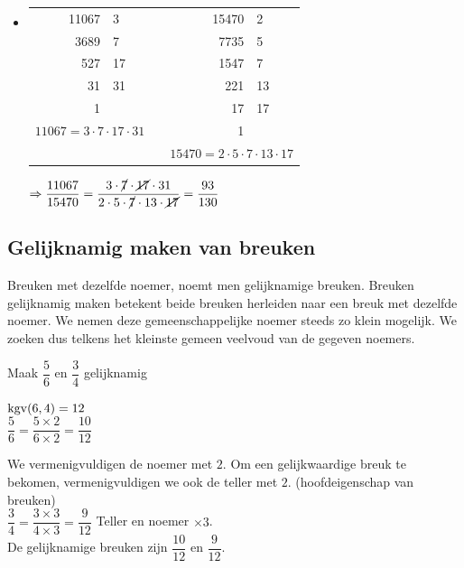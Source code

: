 \documentclass{bis}
\begin{document}
\begin{solution}
\begin{enumerate}
\begin{itemize}
    $\Rightarrow \dfrac{658}{1128}=\dfrac{\cancel{2}\cdot 7\cdot \cancel{47}}{2\cdot \cancel{2}\cdot 2\cdot 3\cdot \cancel{47}}=\dfrac{7}{12}$\\
    \item
    \begin{tabular}[t]{r|lp{2cm}r|l}
    11067 & 3  & & 15470 &  2\\
     3689 & 7  & &  7735 &  5\\
      527 & 17 & &  1547 &  7\\
       31 & 31 & &   221 & 13\\
        1 &    & &    17 & 17\\
    \multicolumn{2}{c}{$11067=3\cdot7\cdot17\cdot31$}& &   1 & \\
    \multicolumn{2}{c}{}
    &&\multicolumn{2}{c}{$15470=2\cdot5\cdot7\cdot13\cdot17$}
    \end{tabular}
    
    $\Rightarrow \dfrac{11067}{15470}=\dfrac{3\cdot\cancel{7}\cdot \cancel{17}\cdot 31}{2\cdot 5\cdot \cancel{7}\cdot 13\cdot \cancel{17}}=\dfrac{93}{130}$\\
    
    \end{itemize}
\end{enumerate}
\end{solution}

\subsection{Gelijknamig maken van breuken}

Breuken met dezelfde noemer, noemt men gelijknamige breuken.
Breuken gelijknamig maken betekent beide breuken herleiden naar een breuk met dezelfde noemer.
We nemen deze gemeenschappelijke noemer steeds zo klein mogelijk.
We zoeken dus telkens het kleinste gemeen veelvoud van de gegeven noemers.


\begin{voorbeeld}
Maak $\dfrac{5}{6}$ en $\dfrac{3}{4}$ gelijknamig

$\kgv(6,4)=12$\\

$\dfrac{5}{6}= \dfrac{5\times 2}{6\times 2}=\dfrac{10}{12}$

We vermenigvuldigen de noemer met $2$. Om een gelijkwaardige breuk te bekomen, vermenigvuldigen we ook de teller met $2$. (hoofdeigenschap van breuken)\\

$\dfrac{3}{4}= \dfrac{3\times 3}{4\times 3}=\dfrac{9}{12}$ \qquad Teller en noemer $\times 3$.\\

De gelijknamige breuken zijn $\dfrac{10}{12}$ en $\dfrac{9}{12}$.
\end{voorbeeld}
\end{document}
